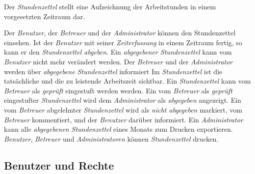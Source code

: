 \begin{requirements}
    Der \emph{Stundenzettel} stellt eine Aufzeichnung der Arbeitstunden in einem vorgesetzten Zeitraum dar.
    \begin{requirements}
         Der \emph{Benutzer}, der \emph{Betreuer} und der \emph{Administrator} können den Stundenzettel einsehen.
         Ist der \emph{Benutzer} mit seiner \emph{Zeiterfassung} in einem Zeitraum fertig, so kann er den \emph{Stundenzettel abgeben}.
         Ein \emph{abgegebener Stundenzettel} kann vom \emph{Benutzer} nicht mehr verändert werden.
         Der \emph{Betreuer} und der \emph{Administrator} werden über \emph{abgegebene Stundenzettel} informiert
         Im \emph{Stundenzettel} ist die tatsächliche und die zu leistende Arbeitszeit sichtbar.
         Ein \emph{Stundenzettel} kann vom \emph{Betreuer} als \emph{geprüft} eingestuft werden werden.
         Ein vom \emph{Betreuer} als \emph{geprüft} eingestufter \emph{Stundenzettel} wird dem \emph{Administrator} als \emph{abgegeben} angezeigt.
         Ein vom \emph{Betreuer} abgelehnter \emph{Stundenzettel} wird als \emph{nicht abgegeben} markiert, vom \emph{Betreuer} kommentiert, und der \emph{Benutzer} darüber informiert.
         Ein \emph{Administrator} kann alle \emph{abgegebenen Stundenzettel} eines Monats zum Drucken exportieren.
        \emph{Benutzer}, \emph{Betreuer} und \emph{Administratoren} können \emph{Stundenzettel} drucken.
    \end{requirements}

\end{requirements}

\subsection{Benutzer und Rechte}

